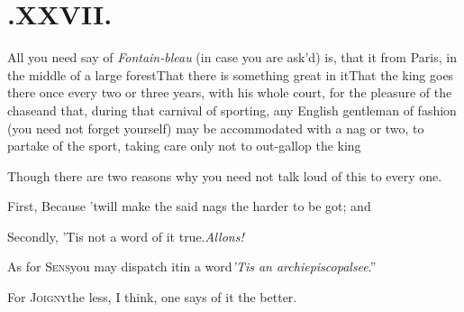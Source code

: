 \documentclass{article}
\begin{document}
\section{.\enspace XXVII.}

\quad\tsh All you need say of \textit{Fontain-\break bleau} (in case you are ask’d)
is, that it\break{}\break
from Paris, in the middle of
a large forest\tsh That there is something great in it\tsh That the king goes
there once every two or three years, with his whole court, for the pleasure of the
chase\tsk and that, during that carnival of sporting, any English gentleman of fashion
(you need not forget yourself) may be accommodated with a nag or two, to partake of
the sport, taking care only not to out-gallop the king\tsh

Though there are two reasons why you need not talk loud of this
to every one.

First, Because ’twill make the said nags the harder to be
got; and

Secondly, ’Tis not a word of it
true.\break\tsh \textit{Allons!}

As for \textsc{Sens}\tsh you may
dispatch it\break in a word\tsh \lqq\textit{’Tis an
archiepiscopal\break see}.”

\tsh For \textsc{Joigny}\tsk the less, I think,\break
one says of it the better.
\end{document}

